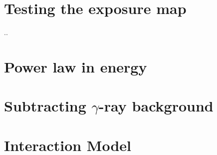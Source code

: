 \appendices


\chapter{Testing the exposure map}
\label{appendix:exposure}
..

\chapter{Power law in energy}
\label{appendix:pw_energy}


\chapter{Subtracting $\gamma$-ray background}


\chapter{Interaction Model}
\label{appendix:interaction_model}







